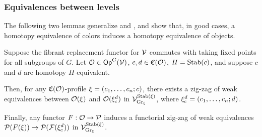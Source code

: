 \documentclass[a4paper,10pt
,draft
]{article}%
\renewcommand{\F}{\mathcal F}
\renewcommand{\1}{\ensuremath{\mathbb{id}}}
\begin{document}
\subsubsection{Equivalences between levels}


The following two lemmas generalize \cite[Prop. 4.14]{Cav14} and \cite[Prop. 2.12]{BM13},
and show that, in good cases, a homotopy equivalence of colors induces a homotopy equivalence of objects.

\begin{lemma}
      \label{CAV_4.14_PROP1}
      Suppose the fibrant replacement functor for $\mathcal V$ commutes with taking fixed points for all subgroups of $G$.
      Let $\mathcal{O} \in \mathsf{Op}^G(\mathcal V)$,
      $c,d \in \mathfrak C(\mathcal{O})$, 
      $H = \mathrm{Stab}(c)$, and suppose $c$ and $d$ are homotopy $H$-equivalent.

      Then, for any $\mathfrak C(\mathcal{O})$-profile $\xi = (c_1,\dots, c_n;c)$,
      there exists a zig-zag of weak equivalences between
      $\mathcal{O}(\xi)$ and $\mathcal{O}(\xi_c^d)$
      in $\mathcal V^{\mathrm{Stab}(\xi)}_{\mathrm{Gr}_\xi}$,
      where $\xi_c^d = (c_1,\dots, c_n;d)$.

      Finally, any functor $F: \mathcal{O} \to \mathcal{P}$ induces a functorial zig-zag of weak equivalences
      $\P(F(\ksi)) \to \P(\F(\ksi_c^d))$ in $\mathcal V^{\mathrm{Stab}(\xi)}_{\mathrm{Gr}_\xi}$. 
\end{lemma}
\end{document}

